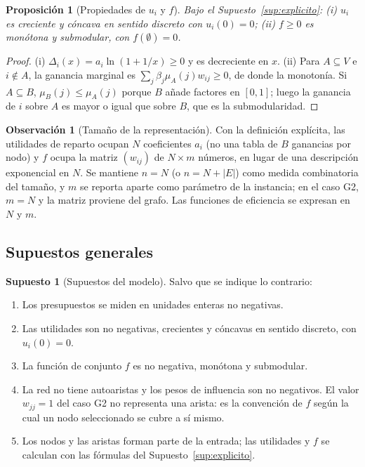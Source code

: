\documentclass[11pt,a4paper]{article}
\theoremstyle{definition}
\newtheorem{supuesto}[definicion]{Supuesto}
\newtheorem{observacion}[definicion]{Observación}
\theoremstyle{plain}
\newtheorem{proposicion}[definicion]{Proposición}
\begin{document}
\begin{proposicion}[Propiedades de $u_i$ y $f$]\label{prop:propiedades}
Bajo el Supuesto~\ref{sup:explicito}: (i) $u_i$ es creciente y cóncava en
sentido discreto con $u_i(0)=0$; (ii) $f\ge0$ es monótona y submodular, con
$f(\emptyset)=0$.
\end{proposicion}

\begin{proof}
(i) $\Delta_i(x)=a_i\ln(1+1/x)\ge0$ y es decreciente en $x$.
(ii) Para $A\subseteq V$ e $i\notin A$, la ganancia marginal es
$\sum_j\beta_j\mu_A(j)w_{ij}\ge0$, de donde la monotonía. Si $A\subseteq B$,
$\mu_B(j)\le\mu_A(j)$ porque $B$ añade factores en $[0,1]$; luego la ganancia de
$i$ sobre $A$ es mayor o igual que sobre $B$, que es la submodularidad.
\end{proof}

\begin{observacion}[Tamaño de la representación]
\label{obs:representacion}
Con la definición explícita, las utilidades de reparto ocupan $N$ coeficientes
$a_i$ (no una tabla de $B$ ganancias por nodo) y $f$ ocupa la matriz
$(w_{ij})$ de $N\times m$ números, en lugar de una descripción exponencial en
$N$. Se mantiene $n=N$ (o $n=N+|E|$) como medida combinatoria del tamaño, y $m$
se reporta aparte como parámetro de la instancia; en el caso G2, $m=N$ y la
matriz proviene del grafo. Las funciones de eficiencia se expresan en $N$ y $m$.
\end{observacion}

\subsection{Supuestos generales}

\begin{supuesto}[Supuestos del modelo]\label{sup:modelo}
Salvo que se indique lo contrario:
\begin{enumerate}[leftmargin=*,label=\arabic*)]
  \item Los presupuestos se miden en unidades enteras no negativas.
  \item Las utilidades son no negativas, crecientes y cóncavas en sentido
  discreto, con $u_i(0)=0$.
  \item La función de conjunto $f$ es no negativa, monótona y submodular.
  \item La red no tiene autoaristas y los pesos de influencia son no negativos.
  El valor $w_{jj}=1$ del caso G2 no representa una arista: es la convención de
  $f$ según la cual un nodo seleccionado se cubre a sí mismo.
  \item Los nodos y las aristas forman parte de la entrada; las utilidades y
  $f$ se calculan con las fórmulas del Supuesto~\ref{sup:explicito}.
\end{enumerate}
\end{supuesto}
\end{document}
